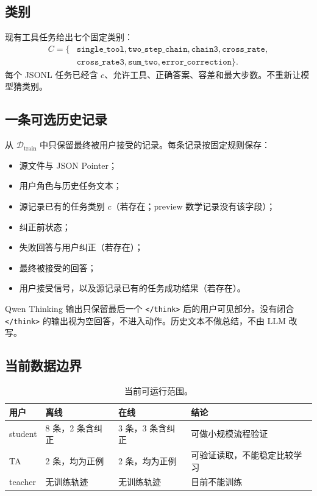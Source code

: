 \documentclass[11pt,UTF8,fontset=none]{ctexart}
\newcommand{\Dtrain}{\mathcal D_{\mathrm{train}}}
\begin{document}
\subsection{类别}

现有工具任务给出七个固定类别：
\[
  \begin{aligned}
  C=\{&
  \texttt{single\_tool},\texttt{two\_step\_chain},
  \texttt{chain3},\texttt{cross\_rate},\\
  &\texttt{cross\_rate3},\texttt{sum\_two},
  \texttt{error\_correction}\}.
  \end{aligned}
\]
每个 JSONL 任务已经含 \(c\)、允许工具、正确答案、容差和最大步数。不重新让模型猜类别。

\subsection{一条可选历史记录}

从 \(\Dtrain\) 中只保留最终被用户接受的记录。每条记录按固定规则保存：
\begin{itemize}
  \item 源文件与 JSON Pointer；
  \item 用户角色与历史任务文本；
  \item 源记录已有的任务类别 \(c\)（若存在；preview 数学记录没有该字段）；
  \item 纠正前状态；
  \item 失败回答与用户纠正（若存在）；
  \item 最终被接受的回答；
  \item 用户接受信号，以及源记录已有的任务成功结果（若存在）。
\end{itemize}

Qwen Thinking 输出只保留最后一个 \texttt{</think>} 后的用户可见部分。没有闭合
\texttt{</think>} 的输出视为空回答，不进入动作。历史文本不做总结，不由 LLM 改写。

\subsection{当前数据边界}

\begin{table}[ht]
  \centering
  \caption{当前可运行范围。}
  \begin{tabularx}{0.94\textwidth}{@{}L{0.18\textwidth}L{0.24\textwidth}L{0.24\textwidth}Y@{}}
    \toprule
    用户 & 离线 & 在线 & 结论 \\
    \midrule
    student & 8 条，2 条含纠正 & 3 条，3 条含纠正 & 可做小规模流程验证 \\
    TA & 2 条，均为正例 & 2 条，均为正例 & 可验证读取，不能稳定比较学习 \\
    teacher & 无训练轨迹 & 无训练轨迹 & 目前不能训练 \\
    \bottomrule
  \end{tabularx}
\end{table}
\end{document}
